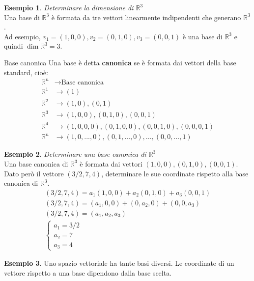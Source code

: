 \documentclass[a4paper]{article}
\theoremstyle{definition}
\newtheorem*{es}{Esempio}
\begin{document}
\begin{es}
	\textit{Determinare la dimensione di $\mathbb{R}^3$} \\
	Una base di $\mathbb{R}^3$ è formata da tre vettori linearmente indipendenti che generano $\mathbb{R}^3$. \\
	Ad esempio, $v_1 = (1, 0, 0), v_2 = (0, 1, 0), v_3 = (0, 0, 1)$ è una base di $\mathbb{R}^3$ e quindi $\dim \mathbb{R}^3 = 3$.
\end{es}
\begin{deff}{Base canonica}{}
	Una base è detta \textbf{canonica} se è formata dai vettori della base standard, cioè:
	\begin{align*}
		\mathbb{R}^n & \rightarrow \text{Base canonica}                                   \\
		\mathbb{R}^1 & \rightarrow (1)                                                    \\
		\mathbb{R}^2 & \rightarrow (1, 0), (0, 1)                                         \\
		\mathbb{R}^3 & \rightarrow (1, 0, 0), (0, 1, 0), (0, 0, 1)                        \\
		\mathbb{R}^4 & \rightarrow (1, 0, 0, 0), (0, 1, 0, 0), (0, 0, 1, 0), (0, 0, 0, 1) \\
		\mathbb{R}^n & \rightarrow (1, 0, ..., 0), (0, 1, ..., 0), ..., (0, 0, ..., 1)
	\end{align*}
\end{deff}
\begin{es}
	\textit{Determinare una base canonica di $\mathbb{R}^3$} \\
	Una base canonica di $\mathbb{R}^3$ è formata dai vettori $(1, 0, 0), (0, 1, 0), (0, 0, 1)$.
	Dato però il vettore $(3/2, 7, 4)$, determinare le sue coordinate rispetto alla base canonica di $\mathbb{R}^3$.
	\begin{align*}
		(3/2, 7, 4) = a_1(1, 0, 0) + a_2(0, 1, 0) + a_3(0, 0, 1) \\
		(3/2, 7, 4) = (a_1, 0, 0) + (0, a_2, 0) + (0, 0, a_3)    \\
		(3/2, 7, 4) = (a_1, a_2, a_3)                            \\
		\begin{cases}
			a_1 = 3/2 \\
			a_2 = 7   \\
			a_3 = 4
		\end{cases}
	\end{align*}
\end{es}
\begin{es}
	Uno spazio vettoriale ha tante basi diversi. Le coordinate di un vettore rispetto a una base dipendono dalla base scelta.
\end{es}
\end{document}
